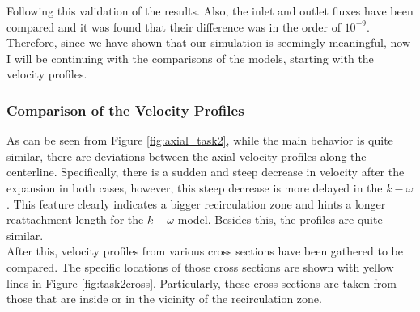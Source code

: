 \noindent Following this validation of the results. Also, the inlet and outlet fluxes have been compared and it was found that their difference was in the order of $10^{-9}$. Therefore, since we have shown that our simulation is seemingly meaningful, now I will be continuing with the comparisons of the models, starting with the velocity profiles.\\

\subsubsection{Comparison of the Velocity Profiles}

\noindent As can be seen from Figure \ref{fig:axial_task2}, while the main behavior is quite similar, there are deviations between the axial velocity profiles along the centerline. Specifically, there is a sudden and steep decrease in velocity after the expansion in both cases, however, this steep decrease is more delayed in the $k-\omega$. This feature clearly indicates a bigger recirculation zone and hints a longer reattachment length for the $k-\omega$ model. Besides this, the profiles are quite similar.\\


\noindent After this, velocity profiles from various cross sections have been gathered to be compared. The specific locations of those cross sections are shown with yellow lines in Figure \ref{fig:task2cross}. Particularly, these cross sections are taken from those that are inside or in the vicinity of the recirculation zone.\\

